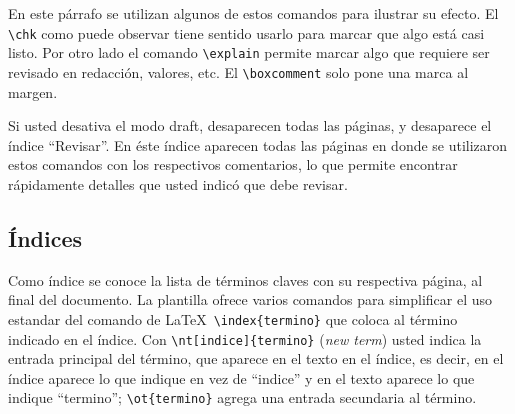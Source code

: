 En este párrafo se utilizan algunos de estos comandos
para ilustrar su efecto.  El \verb+\chk+ como puede observar tiene sentido
usarlo para marcar que algo está casi listo.  Por otro lado 
el comando \verb+\explain+ permite marcar algo que requiere ser revisado en
redacción, valores, etc.  El \verb+\boxcomment+
solo pone una marca al margen.


Si usted desativa el modo draft, desaparecen todas las páginas, y desaparece el
índice ``Revisar''.  En éste índice aparecen todas las páginas en donde se
utilizaron estos comandos con los respectivos comentarios, lo que permite
encontrar rápidamente detalles que usted indicó que debe revisar.

\subsection{Índices}

Como índice se conoce la lista de términos claves con su respectiva página, al
final del documento.  La plantilla ofrece varios comandos para simplificar el
uso estandar del comando de \LaTeX\ \verb+\index{termino}+ que coloca al término
indicado en el índice.  Con \verb+\nt[indice]{termino}+ (\emph{new term}) usted
indica la entrada principal del término, que aparece en el texto en el índice,
es decir, en el índice aparece lo que indique en vez de ``indice'' y en el
texto aparece lo que indique ``termino''; \verb+\ot{termino}+ agrega una
entrada secundaria al término.
